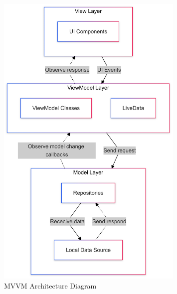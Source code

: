 \documentclass[a4paper,12pt]{report}
\begin{document}
\newpage
\tableofcontents
\newpage
  
\newpage


\begin{figure}[h]
    \centering
    \includegraphics[width=0.8\textwidth]{system_architecture/system_architecture.png}
    \caption{MVVM Architecture Diagram}
\end{figure}
\end{document}

